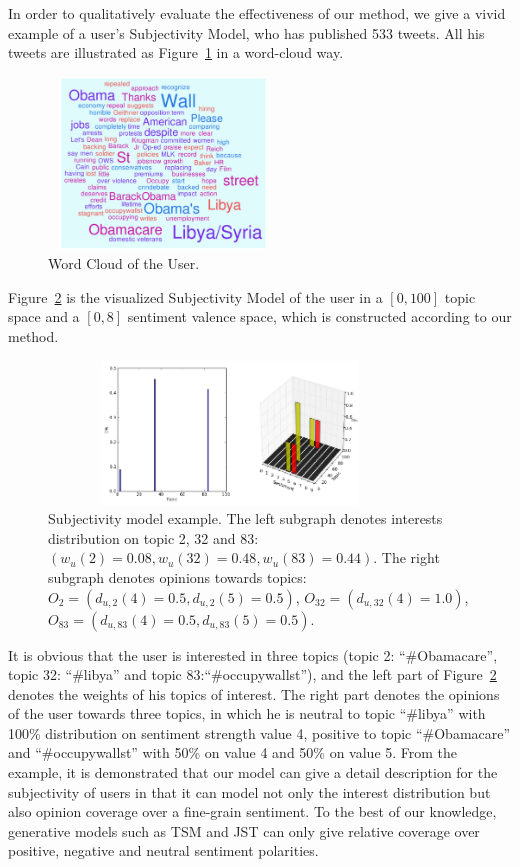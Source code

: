 \documentclass[runningheads,a4paper]{llncs}
\begin{document}
In order to qualitatively evaluate the effectiveness of our method, we give a vivid example of a user's Subjectivity Model, who has published 533 tweets. All his tweets are illustrated as Figure~\ref{fig5} in a word-cloud way.
\begin{figure}[htb]
\centering
\includegraphics[width=2.4in,height=1.8in]{example.pdf}
\caption{Word Cloud of the User.}
\label{fig5}
\end{figure}
Figure~\ref{fig6} is the visualized Subjectivity Model of the user in a $ [0,100] $ topic space and a $ [0,8] $ sentiment valence space, which is constructed according to our method. 
\begin{figure}[htb]
\centering
\includegraphics[width=3.8in,height=1.5in]{fig1.pdf}
\caption{Subjectivity model example. The left subgraph denotes interests distribution on topic 2, 32 and 83: $ (  w_{u}\left( 2 \right)=0.08,w_{u}\left( 32 \right)=0.48, w_{u}\left( 83 \right)=0.44)  $. The right subgraph denotes opinions towards topics: $ O_{2}=( d_{u,2} \left( 4 \right)=0.5, d_{u,2} \left( 5 \right)=0.5)$, $O_{32}=(d_{u,32} \left( 4 \right)=1.0) $, $ O_{83}=( d_{u,83} \left( 4 \right)=0.5, d_{u,83} \left( 5 \right)=0.5 ) $.}
\label{fig6}
\end{figure}
It is obvious that the user is interested in three topics (topic 2: ``\#Obamacare'', topic 32: ``\#libya'' and topic 83:``\#occupywallst''), and  the left part of Figure~\ref{fig6} denotes the weights of his topics of interest. The right part denotes the opinions of the user towards three topics, in which he is neutral to topic ``\#libya'' with 100\% distribution on sentiment strength value 4, positive to topic ``\#Obamacare'' and ``\#occupywallst'' with 50\% on value 4 and 50\% on value 5. 
From the example, it is demonstrated that our model can give a detail description for the subjectivity of users in that it can model not only the interest distribution but also opinion coverage over a fine-grain sentiment. To the best of our knowledge, generative models such as TSM and JST can only give relative coverage over positive, negative and neutral sentiment polarities.
\end{document}
